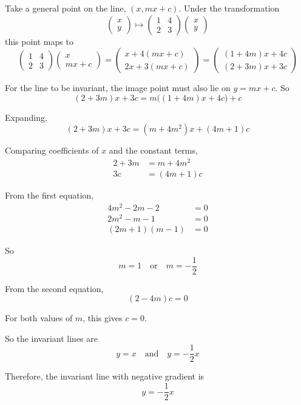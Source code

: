 \documentclass[leqno]{article}
\begin{document}
\begin{enumerate}[
  label=\textbf{\arabic*.},
  leftmargin=*,
  topsep=0pt,
  partopsep=0pt,
  parsep=0pt
]
\begin{tcolorbox}[colback=white, colframe=scarlet, title={\textbf{Solution}}, breakable, grow to left by=6mm, grow to right by=10mm]
Take a general point on the line, \((x,mx+c)\). Under the transformation
\[
\begin{pmatrix}x\\y\end{pmatrix}
\mapsto
\begin{pmatrix}
1 & 4\\
2 & 3
\end{pmatrix}
\begin{pmatrix}x\\y\end{pmatrix}
\]
this point maps to
\[
\begin{pmatrix}
1 & 4\\
2 & 3
\end{pmatrix}
\begin{pmatrix}
x\\
mx+c
\end{pmatrix}
=
\begin{pmatrix}
x+4(mx+c)\\
2x+3(mx+c)
\end{pmatrix}
=
\begin{pmatrix}
(1+4m)x+4c\\
(2+3m)x+3c
\end{pmatrix}
\]

For the line to be invariant, the image point must also lie on \(y=mx+c\). So
\[
(2+3m)x+3c = m\bigl((1+4m)x+4c\bigr)+c
\]

Expanding,
\[
(2+3m)x+3c=(m+4m^2)x+(4m+1)c
\]

Comparing coefficients of \(x\) and the constant terms,
\begin{align*}
2+3m&=m+4m^2\\
3c&=(4m+1)c
\end{align*}

From the first equation,
\begin{align*}
4m^2-2m-2&=0\\
2m^2-m-1&=0\\
(2m+1)(m-1)&=0
\end{align*}

So
\[
m=1 \quad \text{or} \quad m=-\frac12
\]

From the second equation,
\[
(2-4m)c=0
\]

For both values of \(m\), this gives \(c=0\).

So the invariant lines are
\[
y=x
\quad \text{and} \quad
y=-\frac12x
\]

Therefore, the invariant line with negative gradient is
\[
y=-\frac12x
\]


\end{tcolorbox}
\end{enumerate}
\end{document}
